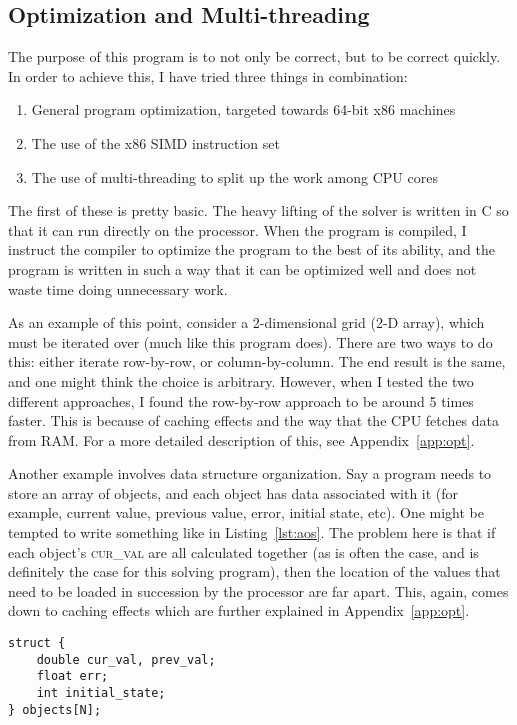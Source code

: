 \subsection{Optimization and Multi-threading}
\label{sec:opt-mul}
The purpose of this program is to not only be correct, but to be correct quickly. In order to achieve this, I have
tried three things in combination:
\begin{enumerate}
\item General program optimization, targeted towards 64-bit x86 machines
\item The use of the x86 SIMD instruction set
\item The use of multi-threading to split up the work among CPU cores
\end{enumerate}
The first of these is pretty basic. The heavy lifting of the solver is written in C so that it can run directly on the
processor. When the program is compiled, I instruct the compiler to optimize the program to the best of its ability,
and the program is written in such a way that it can be optimized well and does not waste time doing unnecessary work.

As an example of this point, consider a 2-dimensional grid (2-D array), which must be iterated over (much like
this program does). There are two ways to do this: either iterate row-by-row, or column-by-column. The end result is
the same, and one might think the choice is arbitrary. However, when I tested the two different approaches, I found
the row-by-row approach to be around 5 times faster. This is because of caching effects and the way that the CPU
fetches data from RAM\cite{intel-1}. For a more detailed description of this, see Appendix~\ref{app:opt}.

Another example involves data structure organization. Say a program needs to store an array of objects, and each object
has data associated with it (for example, current value, previous value, error, initial state, etc). One might be tempted
to write something like in Listing~\ref{lst:aos}. The problem here is that if each object's \textsc{cur\_val} are all
calculated together (as is often the case, and is definitely the case for this solving program), then the location of
the values that need to be loaded in succession by the processor are far apart. This, again, comes down to caching
effects which are further explained in Appendix~\ref{app:opt}.

\begin{minipage}{\linewidth}
\begin{lstlisting}[frame=single,label=lst:aos,caption={Array of structures organization.}]
struct {
	double cur_val, prev_val;
	float err;
	int initial_state;
} objects[N];
\end{lstlisting}
\end{minipage}

